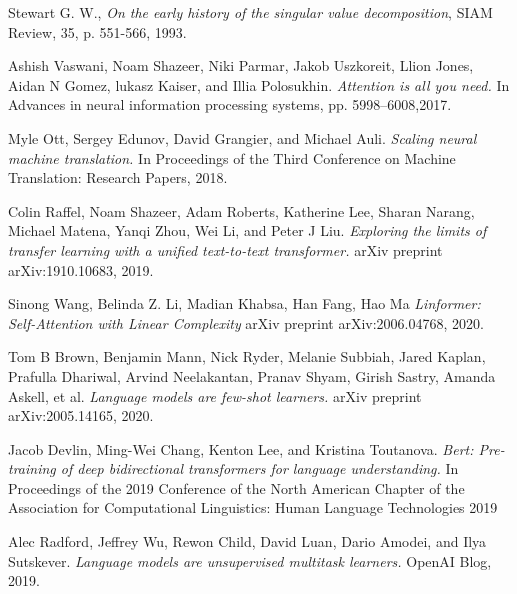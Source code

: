 \documentclass[12pt,a4paper,oneside]{report}
\numberwithin{equation}{section}
\begin{document}
\begin{thebibliography}{99}



Stewart G. W.,
\emph{On the early history of the singular value decomposition},
SIAM Review, 35, p. 551-566, 1993.


Ashish Vaswani, Noam Shazeer, Niki Parmar, Jakob Uszkoreit, Llion Jones, Aidan N Gomez, lukasz Kaiser, and Illia Polosukhin.
\emph{Attention is all you need.}
In Advances in neural information processing systems, pp. 5998–6008,2017.

Myle Ott, Sergey Edunov, David Grangier, and Michael Auli.
\emph{Scaling neural machine translation.}
In Proceedings of the Third Conference on Machine Translation: Research Papers, 2018.

Colin Raffel, Noam Shazeer, Adam Roberts, Katherine Lee, Sharan Narang, Michael Matena, Yanqi
Zhou, Wei Li, and Peter J Liu. 
\emph{Exploring the limits of transfer learning with a unified text-to-text
	transformer.}
arXiv preprint arXiv:1910.10683, 2019.

Sinong Wang, Belinda Z. Li, Madian Khabsa, Han Fang, Hao Ma
\emph{Linformer: Self-Attention with Linear Complexity}
arXiv preprint arXiv:2006.04768, 2020.

Tom B Brown, Benjamin Mann, Nick Ryder, Melanie Subbiah, Jared Kaplan, Prafulla Dhariwal,
Arvind Neelakantan, Pranav Shyam, Girish Sastry, Amanda Askell, et al. 
\emph{Language models are few-shot learners.}
arXiv preprint arXiv:2005.14165, 2020.

Jacob Devlin, Ming-Wei Chang, Kenton Lee, and Kristina Toutanova.
\emph{Bert: Pre-training of deep bidirectional transformers for language understanding.}
In Proceedings of the 2019 Conference of the North American Chapter of the Association for Computational Linguistics: Human Language Technologies 2019

Alec Radford, Jeffrey Wu, Rewon Child, David Luan, Dario Amodei, and Ilya Sutskever. 
\emph{Language models are unsupervised multitask learners.}
OpenAI Blog, 2019.


\end{thebibliography}
\end{document}
